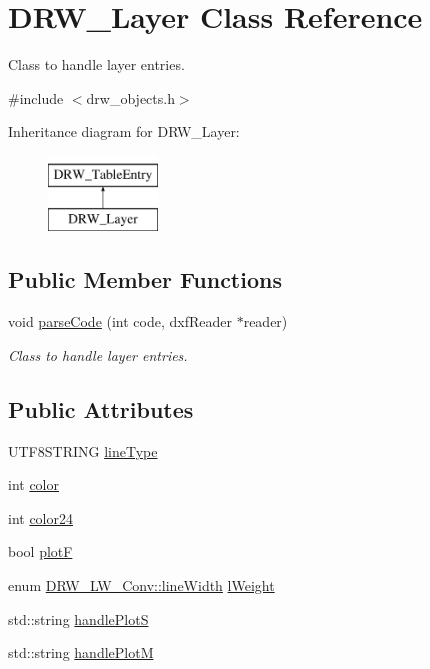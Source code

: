 \hypertarget{class_d_r_w___layer}{}\section{D\+R\+W\+\_\+\+Layer Class Reference}
\label{class_d_r_w___layer}


Class to handle layer entries.  




{\ttfamily \#include $<$drw\+\_\+objects.\+h$>$}

Inheritance diagram for D\+R\+W\+\_\+\+Layer\+:\begin{figure}[H]
\begin{center}
\leavevmode
\includegraphics[height=2.000000cm]{d0/d63/class_d_r_w___layer}
\end{center}
\end{figure}
\subsection*{Public Member Functions}
\begin{DoxyCompactItemize}
\item 
void \hyperlink{class_d_r_w___layer_a3963fb621c29ebeac7b9a75159f37581}{parse\+Code} (int code, dxf\+Reader $\ast$reader)
\begin{DoxyCompactList}\small\item\em Class to handle layer entries. \end{DoxyCompactList}\end{DoxyCompactItemize}
\subsection*{Public Attributes}
\begin{DoxyCompactItemize}
\item 
U\+T\+F8\+S\+T\+R\+I\+N\+G \hyperlink{class_d_r_w___layer_a269aec5f78373fe152d83c39eca08ed0}{line\+Type}
\item 
int \hyperlink{class_d_r_w___layer_a9493b013d49446be87a1021086f7e17c}{color}
\item 
int \hyperlink{class_d_r_w___layer_a20e31ea14b3aff0194d862f06299fc98}{color24}
\item 
bool \hyperlink{class_d_r_w___layer_ac385c41055cb96d3c0ccb2938cb198f9}{plot\+F}
\item 
enum \hyperlink{class_d_r_w___l_w___conv_aed68cbc3d8bdf7e20003dd2d970279b3}{D\+R\+W\+\_\+\+L\+W\+\_\+\+Conv\+::line\+Width} \hyperlink{class_d_r_w___layer_a55dca2dbf071c0350a8b2aa3d9c5bfbd}{l\+Weight}
\item 
std\+::string \hyperlink{class_d_r_w___layer_ab158e3921f753cd59d6121f712062b9d}{handle\+Plot\+S}
\item 
std\+::string \hyperlink{class_d_r_w___layer_a67df26a8d8edf1cc26f62e3634c511ec}{handle\+Plot\+M}
\end{DoxyCompactItemize}
